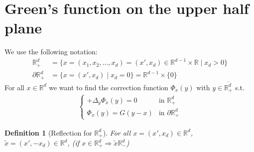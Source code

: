 \documentclass{report}
\theoremstyle{tommy}
\newtheorem{defn}{Definition}
\begin{document}
  \section{Green's function on the upper half plane}
  We use the following notation:
  \begin{align*}
    \mathbb{R}_+^d &= \{x = (x_1, x_2, \dots, x_d) = (x', x_d) \in \mathbb{R}^{d-1} \times \mathbb{R} \mid x_d > 0\} \\
    \partial \mathbb{R}_+^d &= \{x = (x', x_d) \mid x_d = 0\} = \mathbb{R}^{d-1} \times \{0\}
  \end{align*}
  For all \(x \in \mathbb{R}^d\) we want to find the correction function \(\Phi_x(y)\) with \(y \in \overline{\mathbb{R}_{+}^d}\) s.t.
  \begin{align*}
    \begin{cases}
      + \Delta_y \Phi_x(y) = 0 & \text{in } \mathbb{R}_+^d \\ \Phi_x(y) = G(y-x) & \text{in } \partial \mathbb{R}_+^d
    \end{cases}
  \end{align*}

  
  \begin{defn}[Reflection for \(\mathbb{R}_+^d\)] 
    For all \(x = (x', x_d) \in \mathbb{R}^d\), \(\tilde x = (x', -x_d) \in \mathbb{R}^d\), (if \(x \in \mathbb{R}_+^d \Rightarrow \tilde x \mathbb{R}_-^d\)) 
  \end{defn}
    
\end{document}
